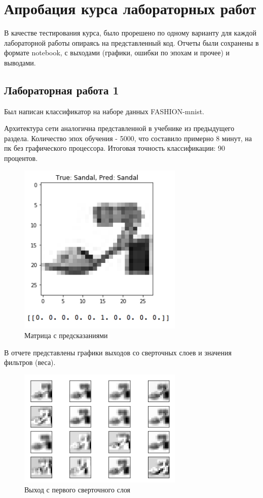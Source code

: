 \chapter{Апробация курса лабораторных работ}

В качестве тестирования курса, было прорешено по одному варианту для каждой лабораторной работы опираясь на представленный код. Отчеты были сохранены в формате notebook, с выходами (графики, ошибки по эпохам и прочее) и выводами.

\section{Лабораторная работа 1}

Был написан классификатор на наборе данных FASHION-mnist.

Архитектура сети аналогична представленной в учебнике из предыдущего раздела. Количество эпох обучения - 5000, что составило примерно 8 минут, на пк без графического процессора. Итоговая точность классификации: 90 процентов.

\begin{figure}[htbp]
\centering
\includegraphics[width=0.7\textwidth]{fig/san}
\caption{Матрица с предсказаниями}%
\label{fig:san}
\end{figure}

В отчете представлены графики выходов со сверточных слоев и значения фильтров (веса).

\begin{figure}[htbp]
\centering
\includegraphics[width=0.7\textwidth]{fig/outsan}
\caption{Выход с первого сверточного слоя}%
\label{fig:san}
\end{figure}

